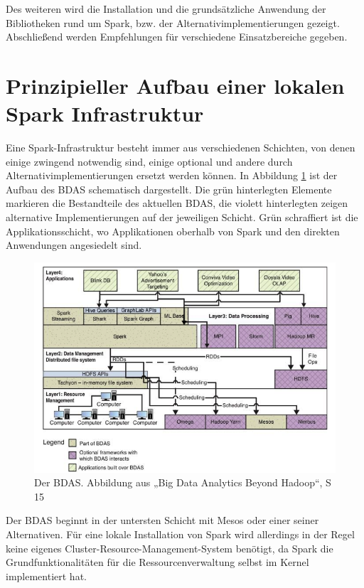 Des weiteren wird die Installation und die grundsätzliche Anwendung der Bibliotheken rund um Spark, bzw. der Alternativimplementierungen gezeigt. Abschließend werden Empfehlungen für verschiedene Einsatzbereiche gegeben. 

\section{Prinzipieller Aufbau einer lokalen Spark Infrastruktur}
\label{section:prinzipiell}

Eine Spark-Infrastruktur besteht immer aus verschiedenen Schichten, von denen einige zwingend notwendig sind, einige optional und andere durch Alternativimplementierungen ersetzt werden können.  
In Abbildung \ref{fig:bdas]} ist der Aufbau des BDAS schematisch dargestellt. Die grün hinterlegten Elemente markieren die Bestandteile des aktuellen BDAS, die violett hinterlegten zeigen alternative Implementierungen auf der jeweiligen Schicht. Grün schraffiert ist die Applikationsschicht, wo Applikationen oberhalb von Spark und den direkten Anwendungen angesiedelt sind. 

\begin{figure}[htb!]
\centering
\includegraphics[width=1.0\textwidth]{bilder/2_2_stack.png}
\caption{Der BDAS. Abbildung aus „Big Data Analytics Beyond Hadoop“, S 15 \protect{}}
\label{fig:bdas]}
\end{figure} 

Der BDAS beginnt in der untersten Schicht mit Mesos oder einer seiner Alternativen. Für eine lokale Installation von Spark wird allerdings in der Regel keine eigenes Cluster-Resource-Management-System benötigt, da Spark die Grundfunktionalitäten für die Ressourcenverwaltung selbst im Kernel implementiert hat. 

